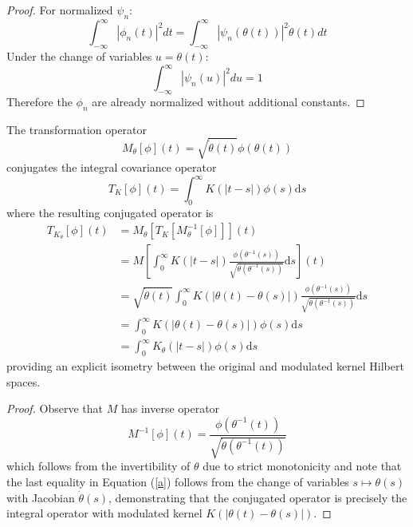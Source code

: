 \documentclass{mc}
\newcommand{\mathd}{\mathrm{d}}
\begin{document}
\begin{proof}
  For normalized $\psi_n$:
  \begin{equation}
    \int_{- \infty}^{\infty} | \phi_n (t) |^2 dt = \int_{- \infty}^{\infty} |
    \psi_n (\theta (t)) |^2 \dot{\theta} (t) dt
  \end{equation}
  Under the change of variables $u = \theta (t)$:
  \begin{equation}
    \int_{- \infty}^{\infty} | \psi_n (u) |^2 du = 1
  \end{equation}
  Therefore the $\phi_n$ are already normalized without additional constants.
\end{proof}

\begin{theorem}
  The transformation operator
  \begin{equation}
    M_{\theta} [\phi] (t) = \sqrt{\dot{\theta} (t)} \phi (\theta (t))
  \end{equation}
  conjugates the integral covariance operator
  \begin{equation}
    T_K [\phi] (t) = \int_0^{\infty} K (|t - s|) \phi (s) \mathd s
  \end{equation}
  where the resulting conjugated operator is
  \begin{equation}
    \begin{array}{ll}
      T_{K_{\theta}}  [\phi] (t) & {= M_{\theta}}  [T_K [M_{\theta}^{- 1}
      [\phi]]] (t)\\
      & = M \left[ \int_0^{\infty} K (|t - s|) \frac{\phi (\theta^{- 1}
      (s))}{\sqrt{\dot{\theta} (\theta^{- 1} (s))}} \mathd s \right] (t)\\
      & = \sqrt{\dot{\theta} (t)}  \int_0^{\infty} K (| \theta (t) - \theta (s)|)
      \frac{\phi (\theta^{- 1} (s))}{\sqrt{\dot{\theta} (\theta^{- 1} (s))}}
      \mathd s\\
      & = \int_0^{\infty} K (| \theta (t) - \theta (s) |) \phi (s) \mathd s\\
      & = \int_0^{\infty} K_{\theta} (| t - s |) \phi (s) \mathd s
    \end{array} \label{a}
  \end{equation}
  providing an explicit isometry between the original and modulated kernel
  Hilbert spaces.
\end{theorem}

\begin{proof}
  Observe that $M$ has inverse operator
  \begin{equation}
    M^{- 1} [\phi] (t) = \frac{\phi (\theta^{- 1} (t))}{\sqrt{\dot{\theta}
    (\theta^{- 1} (t))}}
  \end{equation}
  which follows from the invertibility of $\theta$ due to strict monotonicity
  and note that the last equality in Equation (\ref{a}) follows from the
  change of variables $s \mapsto \theta (s)$ with Jacobian $\dot{\theta} (s)$,
  demonstrating that the conjugated operator is precisely the integral
  operator with modulated kernel $K (| \theta (t) - \theta (s) |)$.
\end{proof}
\end{document}
